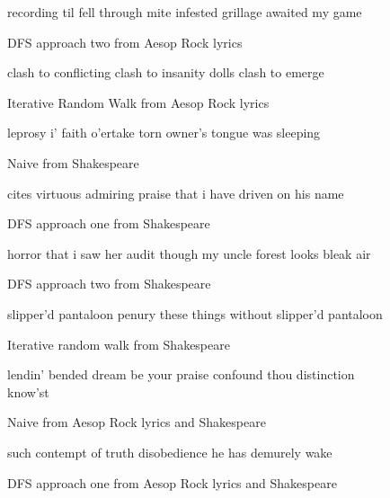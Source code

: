 \documentclass[]{article}
\begin{document}
\begin{figure}[H]
	\centering
	recording til fell \break
	through mite infested grillage \break
	awaited my game
	\caption{DFS approach two from Aesop Rock lyrics}
	\label{fig:DFSTwoAesop}
\end{figure}

\begin{figure}[H]
	\centering
	clash to conflicting \break
	clash to insanity dolls \break
	clash to emerge
	\caption{Iterative Random Walk from Aesop Rock lyrics}
		\label{fig:IRWAesop}
	\end{figure}


\begin{figure}[H]
	\centering
	leprosy i' faith \break
	o'ertake torn owner's \break
	tongue was sleeping
	\caption{Naive from Shakespeare}
	\label{fig:NaiveShakespeare}
\end{figure}

\begin{figure}[H]
	\centering
	cites virtuous \break
	admiring praise that i have \break
	driven on his name
	\caption{DFS approach one from Shakespeare}
	\label{fig:DPSOneShakespeare}
\end{figure}

\begin{figure}[H]
	\centering
	horror that i saw \break
	her audit though my uncle \break
	forest looks bleak air
	\caption{DFS approach two from Shakespeare}
	\label{fig:DFSTwoShakespeare}
\end{figure}

\begin{figure}[H]
	\centering
	slipper'd pantaloon \break
	penury these things without \break
	slipper'd pantaloon
	\caption{Iterative random walk from Shakespeare}
	\label{fig:IRWShakespeare}
\end{figure}


\begin{figure}[H]
	\centering
	lendin' bended dream \break
	be your praise confound thou \break
	distinction know'st
	\caption{Naive from Aesop Rock lyrics and Shakespeare}
	\label{fig:NaiveAesopShakespeare}
\end{figure}

\begin{figure}[H]
	\centering
	such contempt of truth \break
	disobedience he has \break
	demurely wake
	\caption{DFS approach one from Aesop Rock lyrics and Shakespeare}
	\label{fig:DFSOneAesopShakespeare}
\end{figure}
\end{document}
